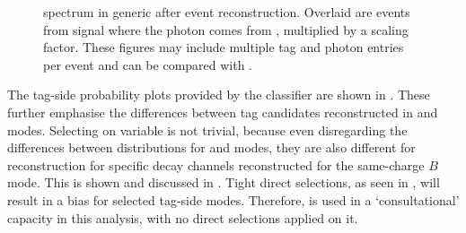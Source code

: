 \begin{figure}[htbp!]
    \centering
    \caption{\label{fig:spectrum_after_reco} \BtoXsgamma spectrum in generic \MC after event reconstruction.
    Overlaid are events from signal \MC where the photon comes from \BtoXsgamma, multiplied by a scaling factor.
    These figures may include multiple tag and photon entries per event and can be compared with .
    }
\end{figure}

The tag-side probability plots provided by the \FEI classifier are shown in .
These further emphasise the differences between tag candidates reconstructed in \FEI \Bp and \FEI \Bz modes.
Selecting on \feiProb variable is not trivial, 
because even disregarding the differences between distributions for \FEI \Bp and \Bz modes, 
they are also different for reconstruction for specific decay channels reconstructed for the same-charge $B$ mode.
This is shown and discussed in  .
Tight direct selections, as seen in , will result in a bias for selected tag-side modes.
Therefore, \feiProb is used in a `consultational' capacity in this analysis, with no direct selections applied on it.

